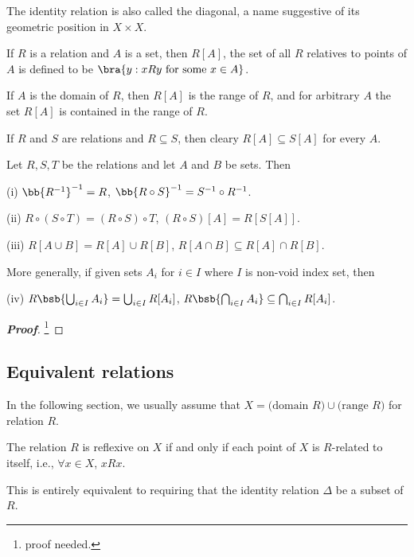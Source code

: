 \begin{remark}
The identity relation is also called the diagonal, a name suggestive of its geometric position in $X\times X$.
\end{remark}


\begin{definition}
If $R$ is a relation and $A$ is a set, then $R[A]$, the set of all $R$ relatives to points of $A$ is defined to be $\bra{y:xRy \text{ for some }x\in A}$.
\end{definition}

\begin{remark}
If $A$ is the domain of $R$, then $R[A]$ is the range of $R$, and for arbitrary $A$ the set $R[A]$ is contained in the range of $R$.

If $R$ and $S$ are relations and $R\subseteq S$, then cleary $R[A] \subseteq S[A]$ for every $A$.
\end{remark}


\begin{proposition}\label{pro:inverse_relation_properties}
Let $R,S,T$ be the relations and let $A$ and $B$ be sets. Then
\ben
\item [(i)] $\bb{R^{-1}}^{-1} = R$, $\bb{R\circ S}^{-1} = S^{-1}\circ R^{-1}$.
\item [(ii)] $R\circ (S\circ T) = (R\circ S)\circ T$, $(R\circ S)[A] = R[S[A]]$.
\item [(iii)] $R[A\cup B] = R[A] \cup R[B]$, $R[A\cap B] \subseteq R[A] \cap R[B]$.
\een

More generally, if given sets $A_i$ for $i\in I$ where $I$ is non-void index set, then
\ben
\item [(iv)] $R\bsb{\bigcup_{i\in I}A_i} = \bigcup_{i\in I} R[A_i]$, $R\bsb{\bigcap_{i\in I}A_i} \subseteq \bigcap_{i\in I} R[A_i]$.
\een
\end{proposition}

\begin{proof}[\bf Proof]
\footnote{proof needed.}
\end{proof}

\subsection{Equivalent relations}

In the following section, we usually assume that $X = \text{(domain $R$)}\cup \text{(range $R$)}$ for relation $R$.

\begin{definition}
The relation $R$ is reflexive on $X$ if and only if each point of $X$ is $R$-related to itself, i.e., $\forall x\in X$, $xRx$.

This is entirely equivalent to requiring that the identity relation $\Delta$ be a subset of $R$.
\end{definition}

